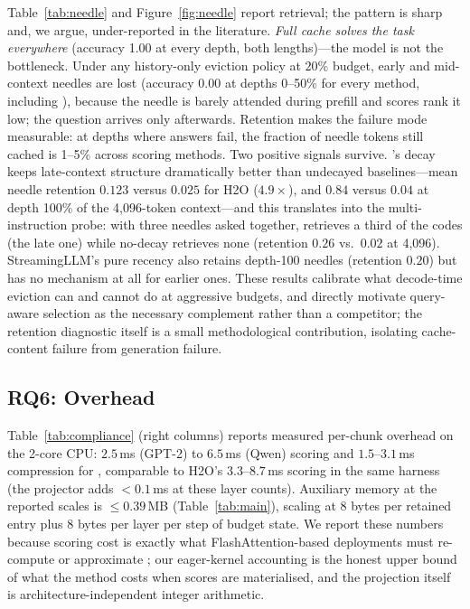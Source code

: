 Table~\ref{tab:needle} and Figure~\ref{fig:needle} report retrieval; the
pattern is sharp and, we argue, under-reported in the literature.
\emph{Full cache solves the task everywhere} (accuracy 1.00 at every
depth, both lengths)---the model is not the bottleneck. Under any
history-only eviction policy at $20\%$ budget, early and mid-context
needles are lost (accuracy 0.00 at depths 0--50\% for every method,
including \sage{}), because the needle is barely attended during prefill
and scores rank it low; the question arrives only afterwards. Retention
makes the failure mode measurable: at depths where answers fail, the
fraction of needle tokens still cached is 1--5\% across scoring methods.
Two positive signals survive. \sage{}'s decay keeps late-context
structure dramatically better than undecayed baselines---mean needle
retention $0.123$ versus $0.025$ for H2O ($4.9\times$), and $0.84$
versus $0.04$ at depth 100\% of the 4{,}096-token context---and this
translates into the multi-instruction probe: with three needles asked
together, \sage{} retrieves a third of the codes (the late one) while
no-decay \sage{} retrieves none (retention $0.26$ vs.\ $0.02$ at
4{,}096). StreamingLLM's pure recency also retains depth-100 needles
(retention $0.20$) but has no mechanism at all for earlier ones. These
results calibrate what decode-time eviction can and cannot do at
aggressive budgets, and directly motivate query-aware selection
\cite{li2024snapkv,tang2024quest,xiao2024duoattention} as the necessary
complement rather than a competitor; the retention diagnostic itself is
a small methodological contribution, isolating cache-content failure from
generation failure.

\subsection{RQ6: Overhead}\label{sec:exp-overhead}

Table~\ref{tab:compliance} (right columns) reports measured per-chunk
overhead on the 2-core CPU: $2.5$\,ms (GPT-2) to $6.5$\,ms (Qwen)
scoring and $1.5$--$3.1$\,ms compression for \sage{}, comparable to H2O's
$3.3$--$8.7$\,ms scoring in the same harness (the projector adds
$<0.1$\,ms at these layer counts). Auxiliary memory at the reported
scales is $\le0.39$\,MB (Table~\ref{tab:main}), scaling at 8 bytes per
retained entry plus 8 bytes per layer per step of budget state. We
report these numbers because scoring cost is exactly what
FlashAttention-based deployments must re-compute or approximate
\cite{mao2026infra}; our eager-kernel accounting is the honest upper
bound of what the method costs when scores are materialised, and the
projection itself is architecture-independent integer arithmetic.

